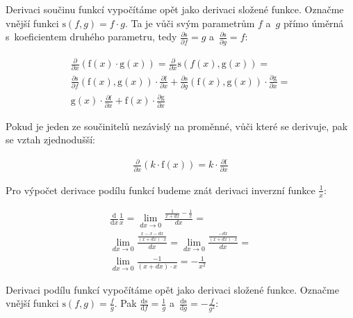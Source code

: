 Derivaci součinu funkcí vypočítáme opět jako derivaci složené funkce. Označme vnější funkci \(\mathrm{s}(f, g) = f \cdot g\). Ta je vůči svým parametrům \(f\) a~\(g\) přímo úměrná s~koeficientem druhého parametru, tedy \(\frac{\partial \mathrm{s}}{\partial f} = g\) a~\(\frac{\partial \mathrm{s}}{\partial g} = f\):

\begin{equation}
\begin{split}
\frac{\partial}{\partial x} (\mathrm{f}(x) \cdot \mathrm{g}(x)) = \frac{\partial}{\partial x} \mathrm{s}({f}(x), \mathrm{g}(x)) = \\
\frac{\partial \mathrm{s}}{\partial f} (\mathrm{f}(x), \mathrm{g}(x)) \cdot \frac{\partial \mathrm{f}}{\partial x} + \frac{\partial \mathrm{s}}{\partial g}(\mathrm{f}(x), \mathrm{g}(x)) \cdot \frac{\partial \mathrm{g}}{\partial x} = \\
\mathrm{g}(x) \cdot \frac{\partial \mathrm{f}}{\partial x} + \mathrm{f}(x) \cdot \frac{\partial \mathrm{g}}{\partial x}
\end{split}
\end{equation}

Pokud je jeden ze součinitelů nezávislý na proměnné, vůči které se derivuje, pak se vztah zjednodušší:

\begin{equation}
\begin{split}
\frac{\partial}{\partial x} (k \cdot \mathrm{f}(x)) = k \cdot \frac{\partial \mathrm{f}}{\partial x}
\end{split}
\end{equation}

Pro výpočet derivace podílu funkcí budeme znát derivaci inverzní funkce \(\frac{1}{x}\):

\begin{equation}
\begin{split}
\frac{\mathrm{d}}{\mathrm{d}x} \frac{1}{x} = \lim_{dx \to 0} \frac{\frac{1}{x + dx} - \frac{1}{x}}{dx} = \\
\lim_{dx \to 0} \frac{\frac{x - x - dx}{(x + dx) \cdot x}}{dx} = \lim_{dx \to 0} \frac{\frac{-dx}{(x + dx) \cdot x}}{dx} = \\
\lim_{dx \to 0} \frac{-1}{(x + dx) \cdot x} = -\frac{1}{x^2}
\end{split}
\end{equation}

Derivaci podílu funkcí vypočítáme opět jako derivaci složené funkce. Označme vnější funkci \(\mathrm{s}(f, g) = \frac{f}{g}\). Pak \(\frac{\mathrm{ds}}{\mathrm{d}f} = \frac{1}{g}\) a~\(\frac{\mathrm{ds}}{\mathrm{d}g} = -\frac{f}{g^2}\):

